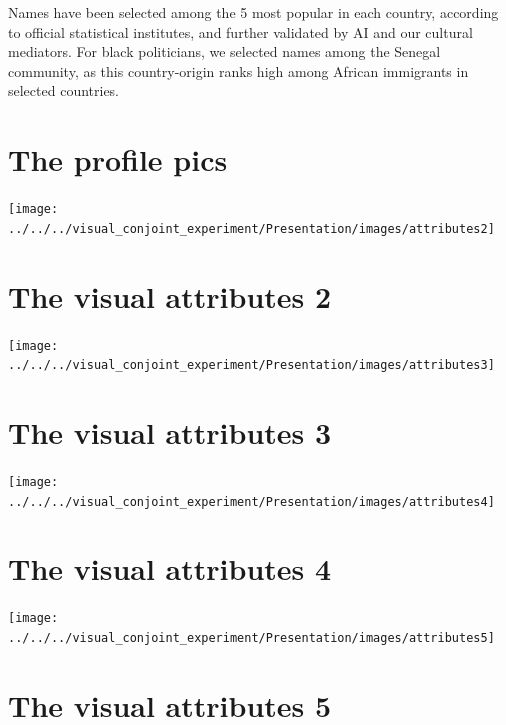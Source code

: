 \documentclass[
]{article}
\begin{document}
Names have been selected among the 5 most popular in each country,
according to official statistical institutes, and further validated by
AI and our cultural mediators. For black politicians, we selected names
among the Senegal community, as this country-origin ranks high among
African immigrants in selected countries.

\section{The profile pics}\label{the-profile-pics}

\begin{center}\texttt{[image: ../../../visual\_conjoint\_experiment/Presentation/images/attributes2]} \end{center}

\section{The visual attributes 2}\label{the-visual-attributes-2}

\begin{center}\texttt{[image: ../../../visual\_conjoint\_experiment/Presentation/images/attributes3]} \end{center}

\section{The visual attributes 3}\label{the-visual-attributes-3}

\begin{center}\texttt{[image: ../../../visual\_conjoint\_experiment/Presentation/images/attributes4]} \end{center}

\section{The visual attributes 4}\label{the-visual-attributes-4}

\begin{center}\texttt{[image: ../../../visual\_conjoint\_experiment/Presentation/images/attributes5]} \end{center}

\section{The visual attributes 5}\label{the-visual-attributes-5}
\end{document}
